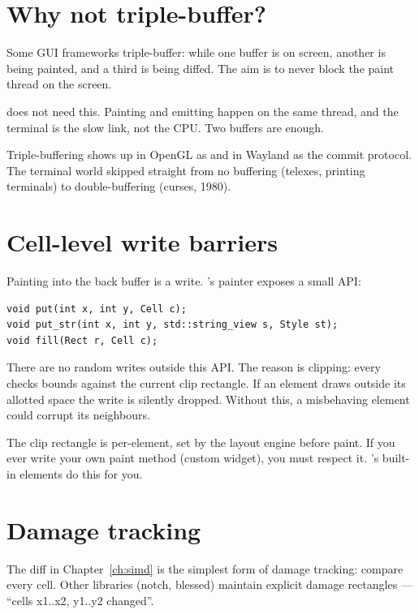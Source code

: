 \section{Why not triple-buffer?}

Some GUI frameworks triple-buffer: while one buffer is on screen,
another is being painted, and a third is being diffed. The aim is
to never block the paint thread on the screen.

\maya{} does not need this. Painting and emitting happen on the
same thread, and the terminal is the slow link, not the CPU. Two
buffers are enough.

\begin{funfact}
Triple-buffering shows up in OpenGL as 
and in Wayland as the  commit protocol. The
terminal world skipped straight from no buffering (telexes,
printing terminals) to double-buffering (curses, 1980).
\end{funfact}

\section{Cell-level write barriers}

Painting into the back buffer is a write. \maya{}'s painter
exposes a small API:

\begin{lstlisting}
void put(int x, int y, Cell c);
void put_str(int x, int y, std::string_view s, Style st);
void fill(Rect r, Cell c);
\end{lstlisting}

There are no random writes outside this API. The reason is
clipping: every  checks bounds against the current
clip rectangle. If an element draws outside its allotted space
the write is silently dropped. Without this, a misbehaving
element could corrupt its neighbours.

\begin{warning}
The clip rectangle is per-element, set by the layout engine
before paint. If you ever write your own paint method (custom
widget), you must respect it. \maya{}'s built-in elements do
this for you.
\end{warning}

\section{Damage tracking}

The diff in Chapter~\ref{ch:simd} is the simplest form of damage
tracking: compare every cell. Other libraries (notch, blessed)
maintain explicit damage rectangles --- ``cells x1..x2, y1..y2
changed''.

